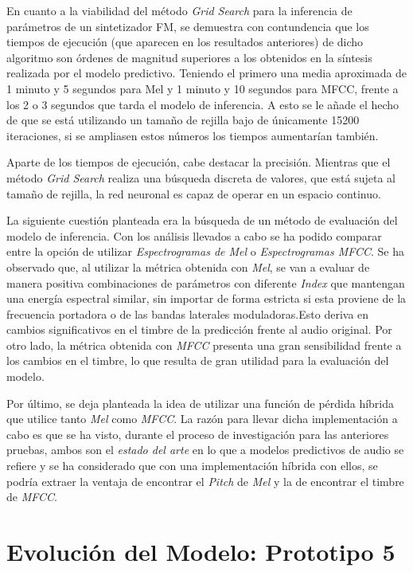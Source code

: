 \documentclass[12pt, a4paper]{article}
\begin{document}
En cuanto a la viabilidad del método \textit{Grid Search} para la inferencia de parámetros de un sintetizador FM,
se demuestra con contundencia que los tiempos de ejecución (que aparecen en los resultados anteriores) de dicho algoritmo
son órdenes de magnitud superiores a los obtenidos en la síntesis realizada por el modelo predictivo. Teniendo el primero 
una media aproximada de 1 minuto y 5 segundos para Mel y 1 minuto y 10 segundos para MFCC, frente a los 2 o 3 segundos
que tarda el modelo de inferencia. A esto se le añade el hecho de que se está utilizando un tamaño de rejilla bajo 
de únicamente 15200 iteraciones, si se ampliasen estos números los tiempos aumentarían también.

Aparte de los tiempos de ejecución, cabe destacar la precisión. Mientras que el método \textit{Grid Search} realiza una 
búsqueda discreta de valores, que está sujeta al tamaño de rejilla, la red neuronal es capaz de operar en un espacio continuo.

La siguiente cuestión planteada era la búsqueda de un método de evaluación del modelo de inferencia. 
Con los análisis llevados a cabo se ha podido comparar entre la opción de utilizar \textit{Espectrogramas de Mel} o \textit{Espectrogramas MFCC}.
Se ha observado que, al utilizar la métrica obtenida con \textit{Mel}, se van a evaluar de manera positiva combinaciones de parámetros con diferente \textit{Index} que mantengan
una energía espectral similar, sin importar de forma estricta si esta proviene de la frecuencia portadora o de las bandas laterales moduladoras.Esto deriva en cambios significativos
en el timbre de la predicción frente al audio original. Por otro lado, la métrica obtenida con \textit{MFCC} presenta una gran sensibilidad
frente a los cambios en el timbre, lo que resulta de gran utilidad para la evaluación del modelo. 

Por último, se deja planteada la idea de utilizar una función de pérdida híbrida que utilice tanto \textit{Mel} como \textit{MFCC}. La razón
para llevar dicha implementación a cabo es que se ha visto, durante el proceso de investigación para las anteriores pruebas, ambos son el \textit{estado del arte} en lo que a modelos predictivos de audio se refiere
y se ha considerado que con una implementación híbrida con ellos, se podría extraer la ventaja de encontrar el \textit{Pitch} de \textit{Mel} y 
la de encontrar el timbre de \textit{MFCC}.



\section{Evolución del Modelo: Prototipo 5}
\end{document}
